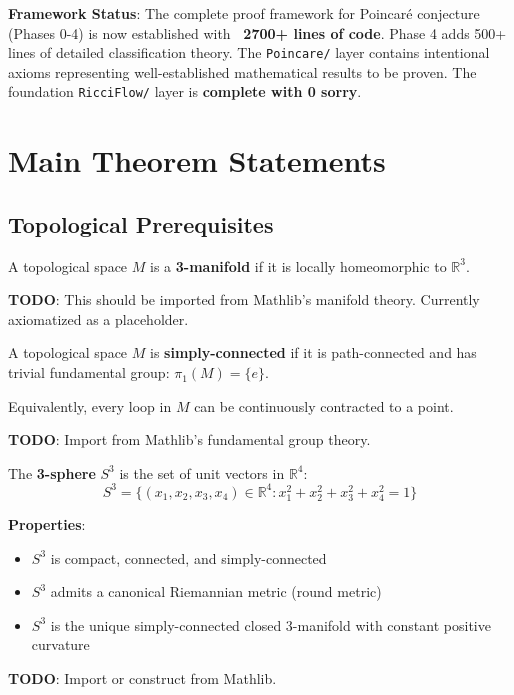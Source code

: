 \textbf{Framework Status}: The complete proof framework for Poincaré conjecture (Phases 0-4) is now established with \textbf{~2700+ lines of code}. Phase 4 adds 500+ lines of detailed classification theory. The \texttt{Poincare/} layer contains intentional axioms representing well-established mathematical results to be proven. The foundation \texttt{RicciFlow/} layer is \textbf{complete with 0 sorry}.

\chapter{Main Theorem Statements}
\label{chap:poincare_theorems}

\section{Topological Prerequisites}

\begin{definition}[3-Manifold]
\label{def:3manifold}
A topological space $M$ is a \textbf{3-manifold} if it is locally homeomorphic to $\mathbb{R}^3$.

\textbf{TODO}: This should be imported from Mathlib's manifold theory. Currently axiomatized as a placeholder.
\end{definition}

\begin{definition}
\label{def:simply_connected}
A topological space $M$ is \textbf{simply-connected} if it is path-connected and has trivial fundamental group: $\pi_1(M) = \{e\}$.

Equivalently, every loop in $M$ can be continuously contracted to a point.

\textbf{TODO}: Import from Mathlib's fundamental group theory.
\end{definition}

\begin{definition}[3-Sphere]
\label{def:sphere3}
The \textbf{3-sphere} $S^3$ is the set of unit vectors in $\mathbb{R}^4$:
\[
S^3 = \{(x_1, x_2, x_3, x_4) \in \mathbb{R}^4 : x_1^2 + x_2^2 + x_3^2 + x_4^2 = 1\}
\]

\textbf{Properties}:
\begin{itemize}
\item $S^3$ is compact, connected, and simply-connected
\item $S^3$ admits a canonical Riemannian metric (round metric)
\item $S^3$ is the unique simply-connected closed 3-manifold with constant positive curvature
\end{itemize}

\textbf{TODO}: Import or construct from Mathlib.
\end{definition}

